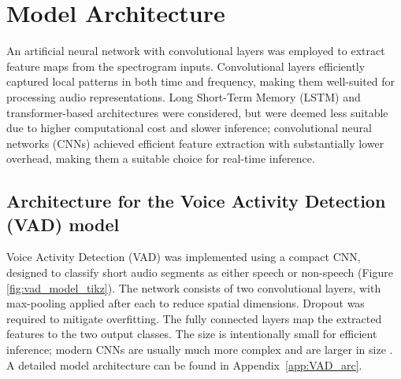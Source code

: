 \section{Model Architecture}
An artificial neural network with convolutional layers was employed to extract feature maps from the spectrogram inputs. Convolutional layers efficiently captured local patterns in both time and frequency, making them well-suited for processing audio representations. Long Short-Term Memory (LSTM) and transformer-based architectures were considered, but were deemed less suitable due to higher computational cost and slower inference; convolutional neural networks (CNNs) achieved efficient feature extraction with substantially lower overhead, making them a suitable choice for real-time inference.

\subsection{Architecture for the Voice Activity Detection (VAD) model}
Voice Activity Detection (VAD) was implemented using a compact CNN, designed to classify short audio segments as either speech or non-speech (Figure \ref{fig:vad_model_tikz}). The network consists of two convolutional layers, with max-pooling applied after each to reduce spatial dimensions. Dropout was required to mitigate overfitting. The fully connected layers map the extracted features to the two output classes. The size is intentionally small for efficient inference; modern CNNs are usually much more complex and are larger in size \cite{modelsizes}. A detailed model architecture can be found in Appendix~\ref{app:VAD_arc}.

